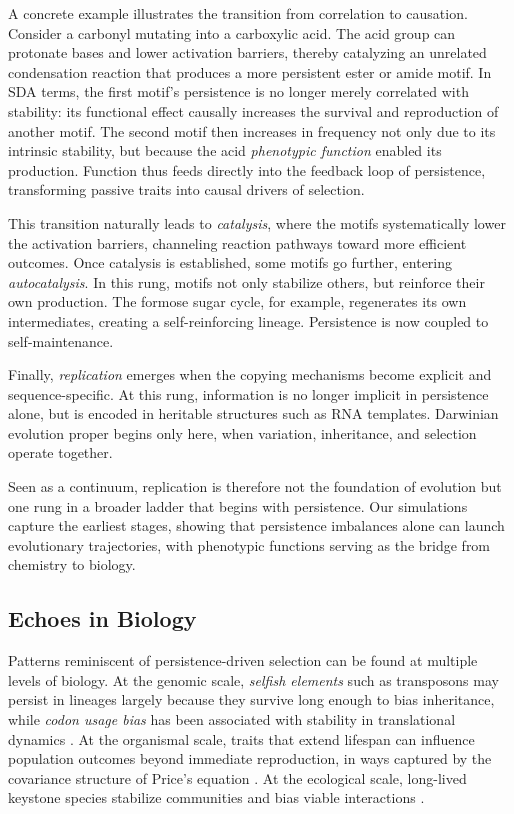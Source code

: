 \documentclass[life,article,submit,pdftex,moreauthors]{Definitions/mdpi}
\begin{document}
A concrete example illustrates the transition from correlation to causation. Consider a carbonyl mutating into a carboxylic acid. The acid group can protonate bases and lower activation barriers, thereby catalyzing an unrelated condensation reaction that produces a more persistent ester or amide motif. In SDA terms, the first motif’s persistence is no longer merely correlated with stability: its functional effect causally increases the survival and reproduction of another motif. The second motif then increases in frequency not only due to its intrinsic stability, but because the acid \emph{phenotypic function} enabled its production. Function thus feeds directly into the feedback loop of persistence, transforming passive traits into causal drivers of selection.  

This transition naturally leads to \emph{catalysis}, where the motifs systematically lower the activation barriers, channeling reaction pathways toward more efficient outcomes. Once catalysis is established, some motifs go further, entering \emph{autocatalysis}. In this rung, motifs not only stabilize others, but reinforce their own production. The formose sugar cycle, for example, regenerates its own intermediates, creating a self-reinforcing lineage. Persistence is now coupled to self-maintenance.  

Finally, \emph{replication} \cite{england2013statphys} emerges when the copying mechanisms become explicit and sequence-specific. At this rung, information is no longer implicit in persistence alone, but is encoded in heritable structures such as RNA templates. Darwinian evolution proper begins only here, when variation, inheritance, and selection operate together.  

Seen as a continuum, replication is therefore not the foundation of evolution but one rung in a broader ladder that begins with persistence. Our simulations capture the earliest stages, showing that persistence imbalances alone can launch evolutionary trajectories, with phenotypic functions serving as the bridge from chemistry to biology.


\subsection{Echoes in Biology}

Patterns reminiscent of persistence-driven selection can be found at multiple levels of biology.  
At the genomic scale, \textit{selfish elements} such as transposons may persist in lineages largely because they survive long enough to bias inheritance, while \textit{codon usage bias} has been associated with stability in translational dynamics \cite{hershberg2008codon}. 
At the organismal scale, traits that extend lifespan can influence population outcomes beyond immediate reproduction, in ways captured by the covariance structure of Price’s equation \cite{price1970}.  
At the ecological scale, long-lived keystone species stabilize communities and bias viable interactions \cite{mills1993keystone}.  
\end{document}
